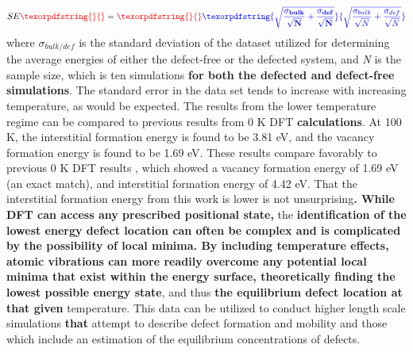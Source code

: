\documentclass[utf8]{frontiersSCNS} %
\providecommand{\DIFaddtex}[1]{{\bf #1}} %
\providecommand{\DIFdeltex}[1]{} %
\providecommand{\DIFaddbegin}{\protect\color{blue}} %
\providecommand{\DIFaddend}{\protect\color{black}} %
\providecommand{\DIFdelbegin}{\protect\color{red}} %
\providecommand{\DIFdelend}{\protect\color{black}} %
\providecommand{\DIFadd}[1]{\texorpdfstring{\DIFaddtex{#1}}{#1}} %
\providecommand{\DIFdel}[1]{\texorpdfstring{\DIFdeltex{#1}}{}} %
\begin{document}
\begin{equation}
\label{eq:surf}
SE \DIFdelbegin \DIFdel{^2 }\DIFdelend = \DIFdelbegin \DIFdel{\frac{\sigma_{bulk}}{\sqrt{N}} + \frac{\sigma_{def}}{\sqrt{N}}
}\DIFdelend \DIFaddbegin \DIFadd{\sqrt{\frac{\sigma_{bulk}}{\sqrt{N}} + \frac{\sigma_{def}}{\sqrt{N}}}
}\DIFaddend \end{equation}where \DIFdelbegin \DIFdel{$\sigma_{bulk/defect}$ }\DIFdelend \DIFaddbegin \DIFadd{$\sigma_{bulk/def}$ }\DIFaddend is the standard deviation of the dataset utilized for determining the average energies of either the defect-free or the defected system, and \textit{N} is the sample size, which is ten simulations \DIFaddbegin \DIFadd{for both the defected and defect-free simulations}\DIFaddend . The standard error in the data set tends to increase with increasing temperature, as would be expected. The results from the lower temperature regime can be compared to previous results from 0 K DFT \DIFdelbegin \DIFdel{calculation}\DIFdelend \DIFaddbegin \DIFadd{calculations}\DIFaddend . At 100 K, the interstitial formation energy is found to be 3.81 eV, and the vacancy formation energy is found to be 1.69 eV. These results compare favorably to previous 0 K DFT results \cite{wirth2011}, which showed a vacancy formation energy of 1.69 eV (an exact match), and interstitial formation energy of 4.42 eV. That the interstitial formation energy from this work is lower is not unsurprising\DIFdelbegin \DIFdel{, as the effect of temperature can yield additional relaxation pathways or defect reorientation that is not strictly achievable through calculations at 0 K. However, }\DIFdelend \DIFaddbegin \DIFadd{. While DFT can access any prescribed positional state, }\DIFaddend the \DIFdelbegin \DIFdel{magnitude of the relaxation cannot be reasonably estimated from 0 K}\DIFdelend \DIFaddbegin \DIFadd{identification of the lowest energy defect location can often be complex and is complicated by the possibility of local minima. By including temperature effects, atomic vibrations can more readily overcome any potential local minima that exist within the energy surface, theoretically finding the lowest possible energy state}\DIFaddend , and thus \DIFdelbegin \DIFdel{requires these high temperature calculations to determine true defect behavior at non-zero }\DIFdelend \DIFaddbegin \DIFadd{the equilibrium defect location at that given }\DIFaddend temperature. This data can be utilized to conduct higher length scale simulations \DIFdelbegin \DIFdel{which }\DIFdelend \DIFaddbegin \DIFadd{that }\DIFaddend attempt to describe defect formation and mobility and those which include an estimation of the equilibrium concentrations of defects. 
\end{document}

